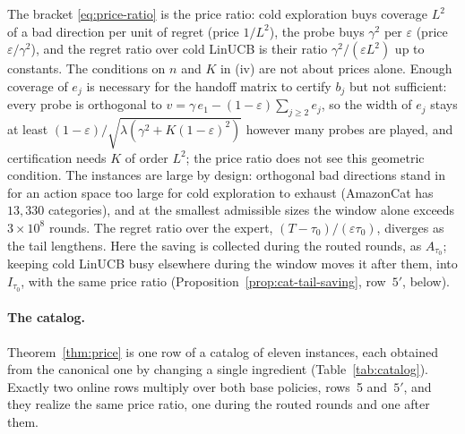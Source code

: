 \documentclass[anon]{alt2027} %
\newcommand{\eps}{\varepsilon}
\begin{document}
The bracket \eqref{eq:price-ratio} is the price ratio: cold exploration buys
coverage $L^2$ of a bad direction per unit of regret (price $1/L^2$), the
probe buys $\gamma^2$ per $\eps$ (price $\eps/\gamma^2$), and the regret ratio over cold
LinUCB is their ratio $\gamma^2/(\eps L^2)$ up to constants. The conditions on
$n$ and $K$ in (iv) are not about prices alone. Enough coverage of $e_j$ is
necessary for the handoff matrix to certify $b_j$ but not sufficient: every
probe is orthogonal to $v=\gamma\,e_1-(1-\eps)\sum_{j\ge2}e_j$, so the width of
$e_j$ stays at least $(1-\eps)/\sqrt{\lambda(\gamma^2+K(1-\eps)^2)}$ however many
probes are played, and certification needs $K$ of order $L^2$; the price
ratio does not see this geometric condition. The instances are large by
design: orthogonal bad directions stand in for an action space too large for
cold exploration to exhaust (AmazonCat has $13{,}330$ categories), and at the
smallest admissible sizes the window alone exceeds $3\times10^8$ rounds. The regret ratio over
the expert, $(T-\tau_0)/(\eps\tau_0)$, diverges as the tail lengthens. Here
the saving is collected during the routed rounds, as $A_{\tau_0}$; keeping
cold LinUCB busy elsewhere during the window moves it after them, into
$I_{\tau_0}$, with the same price ratio (Proposition~\ref{prop:cat-tail-saving},
row~$5'$, below).

\paragraph{The catalog.}
Theorem~\ref{thm:price} is one row of a catalog of eleven instances, each
obtained from the canonical one by changing a single ingredient
(Table~\ref{tab:catalog}). Exactly two online rows multiply over both base policies,
rows~5 and~$5'$, and they realize the same price ratio, one during the routed
rounds and one after them.
\end{document}
